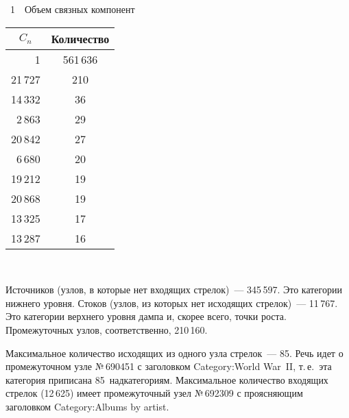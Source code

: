 \begin{multicols}{2}
  \begin{center}  %
\parbox{100pt}{{\tablename~1}\ \ \small{Объем связных компонент}}

\vspace*{6pt}

{\small   
\begin{tabular}{|r|c|}
   \hline
\multicolumn{1}{|c|}{$C_n$}&\multicolumn{1}{c|}{Количество}\\
\hline
1&561\,636\hphantom{9999}\\
21\,727&210\hphantom{9}\\
14\,332&36\\
\hphantom{9}2\,863&29\\
20\,842&27\\
\hphantom{9}6\,680&20\\
19\,212&19\\
20\,868&19\\
13\,325&17\\
13\,287&16\\
\hline
\end{tabular}
}
\end{center}


\addtocounter{table}{1}

   
   



\begin{figure*}[b] %
\vspace*{-6pt}
\vspace*{9pt}
 \begin{center}
 \mbox{%
 \epsfxsize=124.212mm
 }
 \end{center}
 \vspace*{-6pt}
 \end{figure*}
   
   Источников (узлов, в которые нет входящих стрелок)~--- 345\,597. Это категории нижнего 
уровня. Стоков (узлов, из которых нет исходящих стрелок)~--- 11\,767. Это 
категории верхнего уровня дампа и, скорее всего, точки роста. Промежуточных 
узлов, соответственно, 210\,160.
   
   Максимальное количество исходящих из одного узла стрелок~--- 85. Речь идет о 
промежуточном узле №\,690451 с заголовком Category:World War~II, т.\,е.\ эта категория 
приписана 85~надкатегориям. Максимальное количество входящих стрелок (12\,625) имеет 
промежуточный узел №\,692309 с про\-яс\-ня\-ющим заголовком Category:Albums by artist.


\end{multicols}

